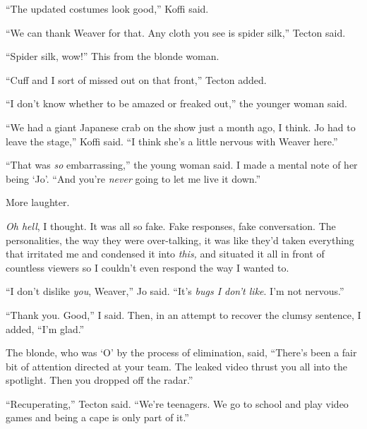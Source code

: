 ``The updated costumes look good,'' Koffi said.



``We can thank Weaver for that.  Any cloth you see is spider silk,'' Tecton said.



``Spider silk, wow!''  This from the blonde woman.



``Cuff and I sort of missed out on that front,'' Tecton added.



``I don't know whether to be amazed or freaked out,'' the younger woman said.



``We had a giant Japanese crab on the show just a month ago, I think.  Jo had to leave the stage,'' Koffi said.  ``I think she's a little nervous with Weaver here.''



``That was \emph{so} embarrassing,'' the young woman said.  I made a mental note of her being `Jo'.  ``And you're \emph{never} going to let me live it down.''



More laughter.



\emph{Oh hell}, I thought.  It was all so fake.  Fake responses, fake conversation.  The personalities, the way they were over-talking, it was like they'd taken everything that irritated me and condensed it into \emph{this, }and situated it all in front of countless viewers so I couldn't even respond the way I wanted to.



``I don't dislike \emph{you}, Weaver,'' Jo said.  ``It's \emph{bugs I don't like}.  I'm not nervous.''



``Thank you.  Good,'' I said.  Then, in an attempt to recover the clumsy sentence, I added, ``I'm glad.''



The blonde, who was `O' by the process of elimination, said, ``There's been a fair bit of attention directed at your team.  The leaked video thrust you all into the spotlight.  Then you dropped off the radar.''



``Recuperating,'' Tecton said.  ``We're teenagers.  We go to school and play video games and being a cape is only part of it.''




